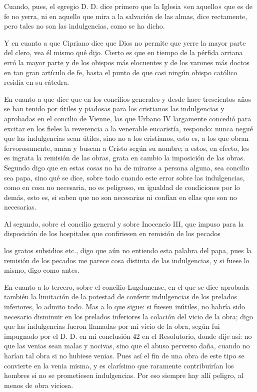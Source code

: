 Cuando, pues, el egregio D. D. dice primero que la Iglesia «en aquello» que es de fe no yerra, ni en aquello que mira a la salvación de las almas, dice rectamente, pero tales no son las indulgencias, como se ha dicho.

Y en cuanto a que Cipriano dice que Dios no permite que yerre la mayor parte del clero, vea él mismo qué dijo. Cierto es que en tiempo de la pérfida arriana erró la mayor parte y de los obispos más elocuentes y de los varones más doctos en tan gran artículo de fe, hasta el punto de que casi ningún obispo católico residía en su cátedra.

En cuanto a que dice que en los concilios generales y desde hace trescientos años se han tenido por útiles y piadosas para los cristianos las indulgencias y aprobadas en el concilio de Vienne, las que Urbano IV largamente concedió para excitar en los fieles la reverencia a la venerable eucaristía, respondo: nunca negué que las indulgencias sean útiles, sino no a los cristianos, esto es, a los que obran fervorosamente, aman y buscan a Cristo según su nombre; a estos, en efecto, les es ingrata la remisión de las obras, grata en cambio la imposición de las obras. Segundo digo que en estas cosas no ha de mirarse a persona alguna, sea concilio sea papa, sino qué se dice, sobre todo cuando este error sobre las indulgencias, como en cosa no necesaria, no es peligroso, en igualdad de condiciones por lo demás, esto es, si saben que no son necesarias ni confían en ellas que son no necesarias.

Al segundo, sobre el concilio general y sobre Inocencio III, que impuso para la disposición de los hospitales que confiriesen en remisión de los pecados

los gratos subsidios etc., digo que aún no entiendo esta palabra del papa, pues la remisión de los pecados me parece cosa distinta de las indulgencias, y si fuese lo mismo, digo como antes.

En cuanto a lo tercero, sobre el concilio Lugdunense, en el que se dice aprobada también la limitación de la potestad de conferir indulgencias de los prelados inferiores, lo admito todo. Mas a lo que sigue: si fuesen inútiles, no habría sido necesario disminuir en los prelados inferiores la colación del vicio de la obra; digo que las indulgencias fueron llamadas por mí vicio de la obra, según fui impugnado por el D. D. en mi conclusión 42 en el Resolutorio, donde dije así: no que las venias sean malas y nocivas, sino que el abuso perverso daña, cuando no harían tal obra si no hubiese venias. Pues así el fin de una obra de este tipo se convierte en la venia misma, y es clarísimo que raramente contribuirían los hombres si no se prometiesen indulgencias. Por eso siempre hay allí peligro, al menos de obra viciosa.

